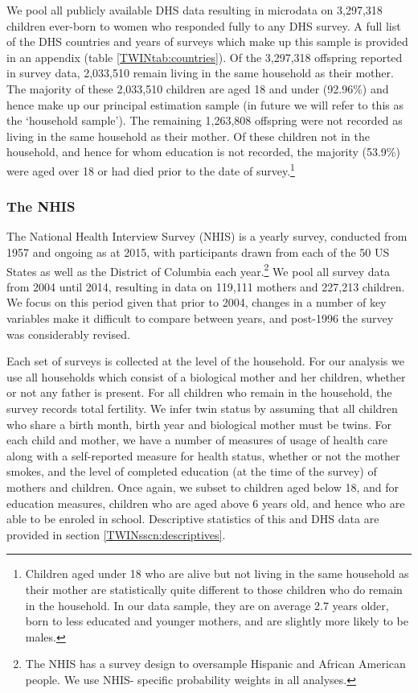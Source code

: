 We pool all publicly available DHS data resulting in microdata on 3,297,318 
children ever-born to women who responded fully to any DHS survey. A full list of 
the DHS countries and years of surveys which make up this sample is provided in
an appendix (table \ref{TWINtab:countries}).  Of the 3,297,318 offspring 
reported in survey data, 2,033,510 remain living in the same household as their 
mother.  The majority of these 2,033,510 children are aged 18 and under (92.96\%) 
and hence make up our principal estimation sample (in future we will refer to this 
as the `household sample'). The remaining 1,263,808 offspring were not recorded as 
living in the same household as their mother.  Of these children not in the 
household, and hence for whom education is not recorded, the majority (53.9\%) 
were aged over 18 or had died prior to the date of survey.\footnote{Children aged 
under 18 who are alive but not living in the same household as their mother are 
statistically quite different to those children who do remain in the household. 
In our data sample, they are on average 2.7 years older, born to less educated 
and younger mothers, and are slightly more likely to be males.}

\subsubsection{The NHIS}
The National Health Interview Survey (NHIS) is a yearly survey, conducted from 
1957 and ongoing as at 2015, with participants drawn from each of the 50 US 
States as well as the District of Columbia each year.\footnote{The NHIS has a
survey design to oversample Hispanic and African American people.  We use NHIS-%
specific probability weights in all analyses.}  We pool all survey data from 
2004 until 2014, resulting in data on 119,111 mothers and 227,213 children. We 
focus on this period given that prior to 2004, changes in a number of key 
variables make it difficult to compare between years, and post-1996 the survey 
was considerably revised.

Each set of surveys is collected at the level of the household.  For our 
analysis we use all households which consist of a biological mother and her 
children, whether or not any father is present.  For all children who remain in
the household, the survey records total fertility.  We infer twin status by
assuming that all children who share a birth month, birth year and biological
mother must be twins.  For each child and mother, we have a number of measures
of usage of health care along with a self-reported measure for health status, 
whether or not the mother smokes, and the level of completed education (at the 
time of the survey) of mothers and children.  Once again, we subset to children
aged below 18, and for education measures, children who are aged above 6 years
old, and hence who are able to be enroled in school.  Descriptive statistics of
this and DHS data are provided in section \ref{TWINsscn:descriptives}.

